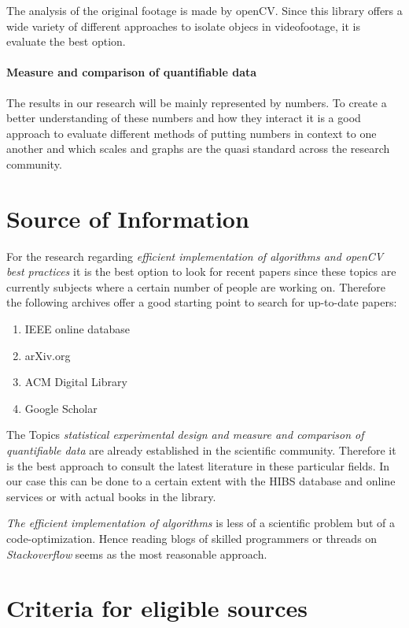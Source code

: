 \documentclass[titlepage, a4paper, 11pt]{scrartcl}
\begin{document}
The analysis of the original footage is made by openCV. Since this library offers a wide variety of different approaches to isolate objecs in videofootage,
it is evaluate the best option.

\paragraph{Measure and comparison of quantifiable data}

The results in our research will be mainly represented by numbers. To create a better understanding of these numbers and how they interact it is a good approach to 
evaluate different methods of putting numbers in context to one another and which scales and graphs are the quasi standard across the research community.


\section{Source of Information}

For the research regarding \textit{efficient implementation of algorithms and openCV best practices} it is the best option to look for recent papers since these topics are currently
subjects where a certain number of people are working on. Therefore the following archives offer a good starting point to search for up-to-date papers:

\begin{enumerate}
    \item IEEE online database
    \item arXiv.org
    \item ACM Digital Library
    \item Google Scholar
\end{enumerate}

The Topics \textit{statistical experimental design and measure and comparison of quantifiable data} are already established in the scientific community.
Therefore it is the best approach to consult the latest literature in these particular fields. In our case this can be done to a certain extent with the HIBS database
and online services or with actual books in the library.

\textit{The efficient implementation of algorithms} is less of a scientific problem but of a code-optimization. Hence reading blogs of skilled programmers or threads on
\textit{Stackoverflow} seems as the most reasonable approach.

\section{Criteria for eligible sources}
\end{document}
